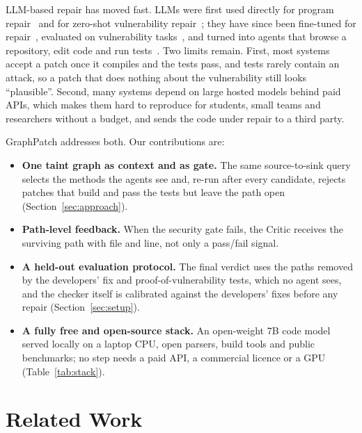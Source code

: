 \documentclass[conference]{IEEEtran}
\begin{document}
LLM-based repair has moved fast. LLMs were first used directly for program
repair~\cite{xia2023apr} and for zero-shot vulnerability repair~\cite{pearce2023zeroshot};
they have since been fine-tuned for repair~\cite{huang2025finetune}, evaluated on
vulnerability tasks~\cite{yin2024multitask}, and turned into agents that browse a
repository, edit code and run tests~\cite{bouzenia2025repairagent}. Two limits remain.
First, most systems accept a patch once it compiles and the tests pass, and tests rarely
contain an attack, so a patch that does nothing about the vulnerability still looks
``plausible''. Second, many systems depend on large hosted models behind paid APIs,
which makes them hard to reproduce for students, small teams and researchers without a
budget, and sends the code under repair to a third party.

GraphPatch addresses both. Our contributions are:
\begin{itemize}
\item \textbf{One taint graph as context and as gate.} The same source-to-sink query
selects the methods the agents see and, re-run after every candidate, rejects patches
that build and pass the tests but leave the path open (Section~\ref{sec:approach}).
\item \textbf{Path-level feedback.} When the security gate fails, the Critic receives
the surviving path with file and line, not only a pass/fail signal.
\item \textbf{A held-out evaluation protocol.} The final verdict uses the paths removed
by the developers' fix and proof-of-vulnerability tests, which no agent sees, and the
checker itself is calibrated against the developers' fixes before any repair
(Section~\ref{sec:setup}).
\item \textbf{A fully free and open-source stack.} An open-weight 7B code model served
locally on a laptop CPU, open parsers, build tools and public benchmarks; no step needs
a paid API, a commercial licence or a GPU (Table~\ref{tab:stack}).
\end{itemize}

\section{Related Work}
\end{document}

